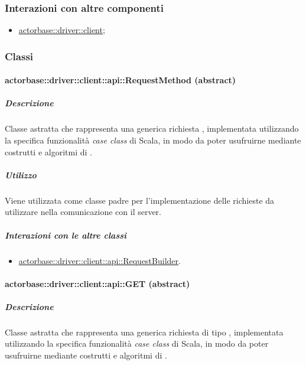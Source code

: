 \documentclass{scalatekids-article}
\begin{document}
\subsubsection{Interazioni con altre componenti}
\begin{itemize}
\item \hyperref[sec:actorbase::driver::client]{actorbase::driver::client};
\end{itemize}

\subsubsection{Classi}

\paragraph{actorbase::driver::client::api::RequestMethod (abstract)}
\label{sec:actorbase::driver::client::api::RequestMethod}

\subparagraph{Descrizione}

Classe astratta che rappresenta una generica richiesta ,
implementata utilizzando la specifica funzionalità \textit{case class} di Scala,
in modo da poter usufruirne mediante costrutti e algoritmi di .

\subparagraph{Utilizzo}

Viene utilizzata come classe padre per l'implementazione delle richieste
 da utilizzare nella comunicazione con il server.

\subparagraph{Interazioni con le altre classi}

\begin{itemize}
\item \hyperref[sec:actorbase::driver::client::api::RequestBuilder]{actorbase::driver::client::api::RequestBuilder}.
\end{itemize}


\paragraph{actorbase::driver::client::api::GET (abstract)}
\label{sec:actorbase::driver::client::api::GET}

\subparagraph{Descrizione}

Classe astratta che rappresenta una generica richiesta  di tipo
, implementata utilizzando la specifica funzionalità \textit{case
  class} di Scala, in modo da poter usufruirne mediante costrutti e algoritmi di
.
\end{document}
